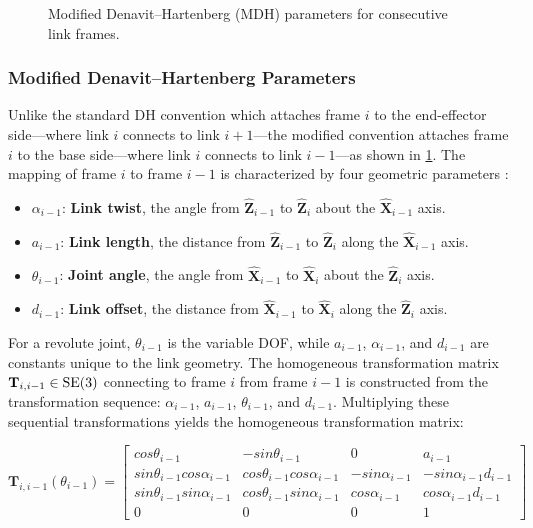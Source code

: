 \begin{figure}[htbp]
    \centering
    
    \caption{Modified Denavit--Hartenberg (MDH) parameters for consecutive link frames.}
    \label{fig:MDH-diagram}
\end{figure}

\subsubsection{Modified Denavit--Hartenberg Parameters}
\label{par:modified-dh}
Unlike the standard \ac{DH} convention which attaches frame $i$ to the end-effector side---where link $i$ connects to link $i+1$---the modified convention attaches frame $i$ to the base side---where link $i$ connects to link $i-1$---as shown in \cref{fig:MDH-diagram}.
The mapping of frame $i$ to frame $i-1$ is characterized by four geometric parameters \cite{Craig05}:
\begin{itemize}
    \item[$\bullet$] $\alpha_{i-1}$: \textbf{Link twist}, the angle from $\hat{\mathbf{Z}}_{i-1}$ to $\hat{\mathbf{Z}}_i$ about the $\hat{\mathbf{X}}_{i-1}$ axis.
    \item[$\bullet$] $a_{i-1}$: \textbf{Link length}, the distance from $\hat{\mathbf{Z}}_{i-1}$ to $\hat{\mathbf{Z}}_i$ along the $\hat{\mathbf{X}}_{i-1}$ axis.
    \item[$\bullet$] $\theta_{i-1}$: \textbf{Joint angle}, the angle from $\hat{\mathbf{X}}_{i-1}$ to $\hat{\mathbf{X}}_i$ about the $\hat{\mathbf{Z}}_i$ axis.
    \item[$\bullet$] $d_{i-1}$: \textbf{Link offset}, the distance from $\hat{\mathbf{X}}_{i-1}$ to $\hat{\mathbf{X}}_i$ along the $\hat{\mathbf{Z}}_i$ axis.
\end{itemize}

For a revolute joint, $\theta_{i-1}$ is the variable \ac{DOF}, while $a_{i-1}$, $\alpha_{i-1}$, and $d_{i-1}$ are constants unique to the link geometry. 
The homogeneous transformation matrix $\mathbf{T}_{i,i-1} \in \mathrm{SE}(3)$ connecting to frame $i$ from frame $i-1$ is constructed from the transformation sequence: $\alpha_{i-1}$, $a_{i-1}$, $\theta_{i-1}$, and $d_{i-1}$. 
Multiplying these sequential transformations yields the homogeneous transformation matrix:

\begin{equation}
    \mathbf{T}_{i,i-1}(\theta_{i-1}) = 
    \begin{bmatrix} 
        cos\theta_{i-1} & -sin\theta_{i-1} & 0 & a_{i-1} \\ 
        sin\theta_{i-1}cos\alpha_{i-1} & cos\theta_{i-1}cos\alpha_{i-1} & -sin\alpha_{i-1} & -sin\alpha_{i-1}d_{i-1} \\ 
        sin\theta_{i-1}sin\alpha_{i-1} & cos\theta_{i-1}sin\alpha_{i-1} & cos\alpha_{i-1} & cos\alpha_{i-1}d_{i-1} \\ 
        0 & 0 & 0 & 1 
    \end{bmatrix}
\label{eq:modified-dh-matrix}
\end{equation}


